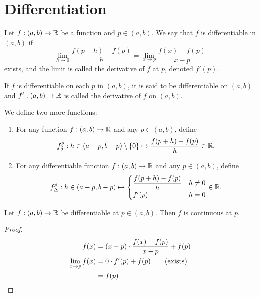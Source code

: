 
\section{Differentiation}

\begin{defn} \label{defn:diff}
    Let $f : (a, b) \to \mathbb{R}$ be a function and $p \in (a, b)$. We say that $f$ is differentiable in $(a, b)$ if \[
        \lim_{h \to 0} \frac{f(p + h) - f(p)}{h} = \lim_{x \to p} \frac{f(x) - f(p)}{x - p}
    \] exists, and the limit is called the derivative of $f$ at $p$, denoted $f'(p)$.

    If $f$ is differentiable on each $p$ in $(a, b)$, it is said to be differentiable on $(a, b)$ and $f' : (a, b) \to \mathbb{R}$ is called the derivative of $f$ on $(a, b)$.

    We define two more functions:
    \begin{enumerate}[label=(\alph*)]
        \item For any function $f : (a, b) \to \mathbb{R}$ and any $p \in (a, b)$, define \[
            f^{p}_{\delta} : h \in (a - p, b - p) \setminus \set{0} \mapsto \frac{f(p + h) - f(p)}{h} \in \R.
        \]
        \item For any differentiable function $f : (a, b) \to \mathbb{R}$ and any $p \in (a, b)$, define \[
            f^{p}_{\Delta} : h \in (a - p, b - p) \mapsto \begin{cases}
                \dfrac{f(p + h) - f(p)}{h} & h \neq 0 \\
                f'(p) & h = 0
            \end{cases} \in \mathbb{R}.
        \]
    \end{enumerate}
\end{defn}

\begin{thm} \label{thm:diff:continuity}
    Let $f : (a, b) \to \mathbb{R}$ be differentiable at $p \in (a, b)$. Then $f$ is continuous at $p$.
\end{thm}
\begin{proof}
    \begin{align*}
        f(x) &= (x - p) \cdot \frac{f(x) - f(p)}{x - p} + f(p) \\
        \lim_{x \to p} f(x) &= 0 \cdot f'(p) + f(p) \tag{exists} \\
        &= f(p) \qedhere
    \end{align*}
\end{proof}

